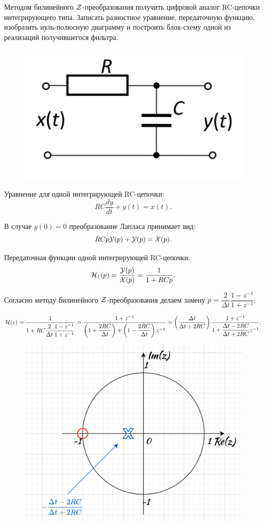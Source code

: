 \newpage
\section{}
Методом билинейного $\mathcal{Z}$-преобразования получить цифровой аналог RC-цепочки интегрирующего типа. Записать разностное уравнение, передаточную функцию, изобразить нуль-полюсную диаграмму и построить блок-схему одной из реализаций получившегося фильтра.

\begin{figure}[!h]
	\centering
	\includegraphics[width=0.35\columnwidth]{pics/fall/11/11-02.png}
	\label{fig:11-02}
\end{figure}

Уравнение для одной интегрирующей RC-цепочки:
\begin{equation*}
	RC \dfrac{dy}{dt} + y(t) = x(t).
\end{equation*}

В случае $y(0) = 0$ преобразование Лапласа принимает вид:
\begin{equation*}
	RC p \mathcal{Y}(p) + \mathcal{Y}(p) = \mathcal{X}(p).
\end{equation*}

Передаточная функции одной интегрирующей RC-цепочки:
\begin{equation*}
	\mathcal{H}_1(p) = \dfrac{\mathcal{Y}(p)}{\mathcal{X}(p)} = \dfrac{1}{1 + RCp}.
\end{equation*}

Согласно методу билинейного $\mathcal{Z}$-преобразования делаем замену $p = \dfrac{2}{\Delta t} \dfrac{1 - z^{-1}}{1 + z^{-1}}$:

\begin{align*}
	\mathcal{H}(z) = \dfrac{1}{1 + RC \dfrac{2}{\Delta t} \dfrac{1 - z^{-1}}{1 + z^{-1}}} = 
	\dfrac{1 + z^{-1}}{\left(1 + \dfrac{2RC}{\Delta t}\right) + \left(1 - \dfrac{2RC}{\Delta t}\right)z^{-1}} =
	\left( \dfrac{\Delta t}{\Delta t + 2RC}\right) \dfrac{1 + z^{-1}}{1 + \dfrac{\Delta t - 2RC}{\Delta t + 2RC}z^{-1}}.
\end{align*}


\begin{figure}[!h]
	\centering
	\includegraphics[width=0.55\columnwidth]{pics/fall/11/11-3.png}
	\label{fig:11-3}
\end{figure}

